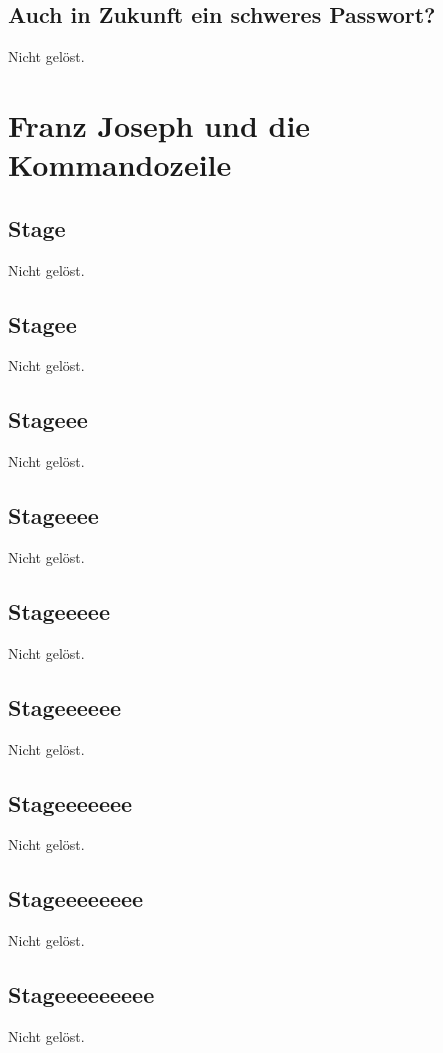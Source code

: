 \documentclass[12pt,a4paper,titlepage,oneside]{scrartcl}
\begin{document}
\subsection{Auch in Zukunft ein schweres Passwort?}
Nicht gelöst.


\section{Franz Joseph und die Kommandozeile}

\subsection{Stage}
Nicht gelöst.

\subsection{Stagee}
Nicht gelöst.

\subsection{Stageee}
Nicht gelöst.

\subsection{Stageeee}
Nicht gelöst.

\subsection{Stageeeee}
Nicht gelöst.

\subsection{Stageeeeee}
Nicht gelöst.

\subsection{Stageeeeeee}
Nicht gelöst.

\subsection{Stageeeeeeee}
Nicht gelöst.

\subsection{Stageeeeeeeee}
Nicht gelöst.
\end{document}

